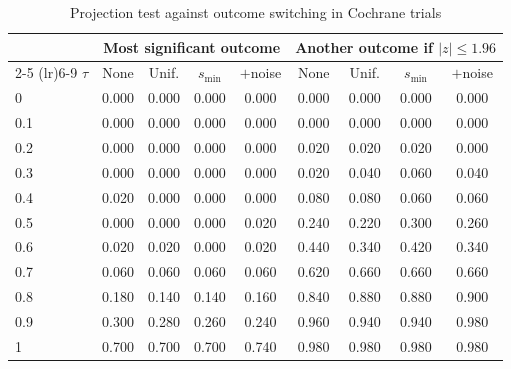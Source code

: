 \begin{table}[htbp]
\centering
\caption{Projection test against outcome switching in Cochrane trials}
\label{tab:cochrane_switching_power_desktop_proj}
\footnotesize
\setlength{\tabcolsep}{4pt}
\begin{tabular}{lcccccccc}
\toprule
 & \multicolumn{4}{c}{Most significant outcome} & \multicolumn{4}{c}{Another outcome if $|z| \le 1.96$} \\
\cmidrule(lr){2-5} \cmidrule(lr){6-9}
$\tau$ & None & Unif. & $s_{\min}$ & $+$noise & None & Unif. & $s_{\min}$ & $+$noise \\
\midrule
0 & 0.000 & 0.000 & 0.000 & 0.000 & 0.000 & 0.000 & 0.000 & 0.000 \\
0.1 & 0.000 & 0.000 & 0.000 & 0.000 & 0.000 & 0.000 & 0.000 & 0.000 \\
0.2 & 0.000 & 0.000 & 0.000 & 0.000 & 0.020 & 0.020 & 0.020 & 0.000 \\
0.3 & 0.000 & 0.000 & 0.000 & 0.000 & 0.020 & 0.040 & 0.060 & 0.040 \\
0.4 & 0.020 & 0.000 & 0.000 & 0.000 & 0.080 & 0.080 & 0.060 & 0.060 \\
0.5 & 0.000 & 0.000 & 0.000 & 0.020 & 0.240 & 0.220 & 0.300 & 0.260 \\
0.6 & 0.020 & 0.020 & 0.000 & 0.020 & 0.440 & 0.340 & 0.420 & 0.340 \\
0.7 & 0.060 & 0.060 & 0.060 & 0.060 & 0.620 & 0.660 & 0.660 & 0.660 \\
0.8 & 0.180 & 0.140 & 0.140 & 0.160 & 0.840 & 0.880 & 0.880 & 0.900 \\
0.9 & 0.300 & 0.280 & 0.260 & 0.240 & 0.960 & 0.940 & 0.940 & 0.980 \\
1 & 0.700 & 0.700 & 0.700 & 0.740 & 0.980 & 0.980 & 0.980 & 0.980 \\
\bottomrule
\end{tabular}
\par\smallskip

\end{table}
